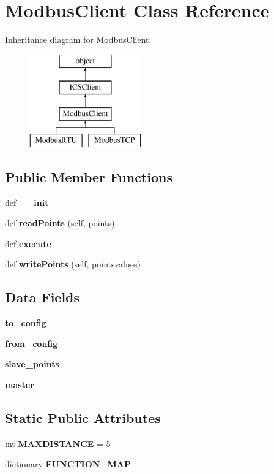 \section{Modbus\+Client Class Reference}
\label{classprotolibs_1_1ics__clients_1_1_modbus_client}
Inheritance diagram for Modbus\+Client\+:\begin{figure}[H]
\begin{center}
\leavevmode
\includegraphics[height=4.000000cm]{classprotolibs_1_1ics__clients_1_1_modbus_client}
\end{center}
\end{figure}
\subsection*{Public Member Functions}
\begin{DoxyCompactItemize}
\item 
def {\bf \+\_\+\+\_\+init\+\_\+\+\_\+}
\item 
def {\bf read\+Points} (self, points)
\item 
def {\bf execute}
\item 
def {\bf write\+Points} (self, pointsvalues)
\end{DoxyCompactItemize}
\subsection*{Data Fields}
\begin{DoxyCompactItemize}
\item 
{\bf to\+\_\+config}
\item 
{\bf from\+\_\+config}
\item 
{\bf slave\+\_\+points}
\item 
{\bf master}
\end{DoxyCompactItemize}
\subsection*{Static Public Attributes}
\begin{DoxyCompactItemize}
\item 
int {\bf M\+A\+X\+D\+I\+S\+T\+A\+N\+C\+E} = 5
\item 
dictionary {\bf F\+U\+N\+C\+T\+I\+O\+N\+\_\+\+M\+A\+P}
\end{DoxyCompactItemize}


